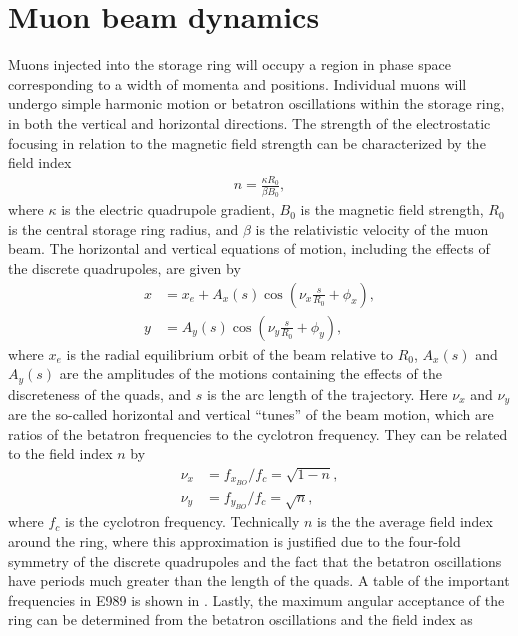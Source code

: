 \section{Muon beam dynamics}
\label{sec:muonbeamdynamics}

Muons injected into the storage ring will occupy a region in phase space corresponding to a width of momenta and positions. Individual muons will undergo simple harmonic motion or betatron oscillations within the storage ring, in both the vertical and horizontal directions. The strength of the electrostatic focusing in relation to the magnetic field strength can be characterized by the field index
        \begin{align} \label{eq:fieldindex}
            n = \frac{\kappa R_{0}}{\beta B_{0}},
        \end{align}
where $\kappa$ is the electric quadrupole gradient, $B_{0}$ is the magnetic field strength, $R_{0}$ is the central storage ring radius, and $\beta$ is the relativistic velocity of the muon beam. The horizontal and vertical equations of motion, including the effects of the discrete quadrupoles, are given by
        \begin{align} \label{eq:betatronmotion}
            x &= x_{e} + A_{x}(s) \cos(\nu_{x} \frac{s}{R_{0}} + \phi_{x}), \\
            y &= A_{y}(s) \cos(\nu_{y} \frac{s}{R_{0}} + \phi_{y}), 
        \end{align}
where $x_{e}$ is the radial equilibrium orbit of the beam relative to $R_{0}$, $A_{x}(s)$ and $A_{y}(s)$ are the amplitudes of the motions containing the effects of the discreteness of the quads, and $s$ is the arc length of the trajectory. Here $\nu_{x}$ and $\nu_{y}$ are the so-called horizontal and vertical ``tunes'' of the beam motion, which are ratios of the betatron frequencies to the cyclotron frequency. They can be related to the field index $n$ by
        \begin{equation} \label{eq:tunes}
        \begin{aligned}
            \nu_{x} &= f_{x_{BO}}/f_{c} = \sqrt{1-n}, \\
            \nu_{y} &= f_{y_{BO}}/f_{c} = \sqrt{n},           
        \end{aligned}
        \end{equation}
where $f_{c}$ is the cyclotron frequency. Technically $n$ is the the average field index around the ring, where this approximation is justified due to the four-fold symmetry of the discrete quadrupoles and the fact that the betatron oscillations have periods much greater than the length of the quads. A table of the important frequencies in E989 is shown in . Lastly, the maximum angular acceptance of the ring can be determined from the betatron oscillations and the field index as 
